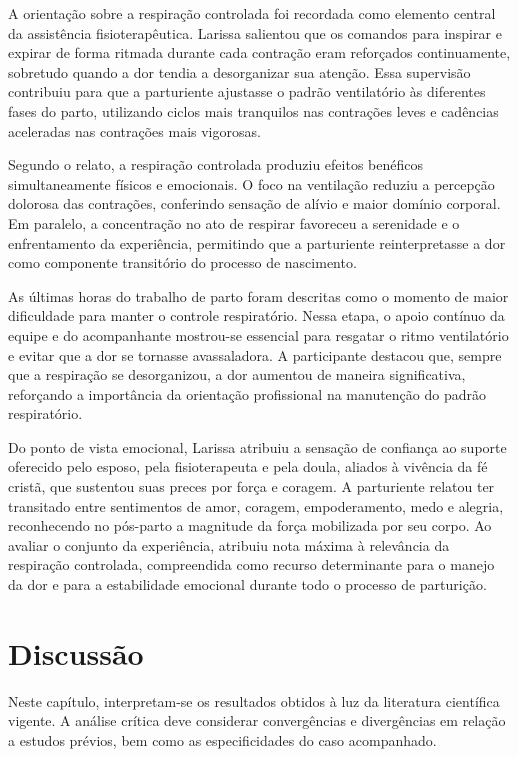 \documentclass[openright]{tex/estilos/normas-utf-tex}
\begin{document}
A orientação sobre a respiração controlada foi recordada como elemento central da assistência fisioterapêutica. Larissa salientou que os comandos para inspirar e expirar de forma ritmada durante cada contração eram reforçados continuamente, sobretudo quando a dor tendia a desorganizar sua atenção. Essa supervisão contribuiu para que a parturiente ajustasse o padrão ventilatório às diferentes fases do parto, utilizando ciclos mais tranquilos nas contrações leves e cadências aceleradas nas contrações mais vigorosas.

Segundo o relato, a respiração controlada produziu efeitos benéficos simultaneamente físicos e emocionais. O foco na ventilação reduziu a percepção dolorosa das contrações, conferindo sensação de alívio e maior domínio corporal. Em paralelo, a concentração no ato de respirar favoreceu a serenidade e o enfrentamento da experiência, permitindo que a parturiente reinterpretasse a dor como componente transitório do processo de nascimento.

As últimas horas do trabalho de parto foram descritas como o momento de maior dificuldade para manter o controle respiratório. Nessa etapa, o apoio contínuo da equipe e do acompanhante mostrou-se essencial para resgatar o ritmo ventilatório e evitar que a dor se tornasse avassaladora. A participante destacou que, sempre que a respiração se desorganizou, a dor aumentou de maneira significativa, reforçando a importância da orientação profissional na manutenção do padrão respiratório.

Do ponto de vista emocional, Larissa atribuiu a sensação de confiança ao suporte oferecido pelo esposo, pela fisioterapeuta e pela doula, aliados à vivência da fé cristã, que sustentou suas preces por força e coragem. A parturiente relatou ter transitado entre sentimentos de amor, coragem, empoderamento, medo e alegria, reconhecendo no pós-parto a magnitude da força mobilizada por seu corpo. Ao avaliar o conjunto da experiência, atribuiu nota máxima à relevância da respiração controlada, compreendida como recurso determinante para o manejo da dor e para a estabilidade emocional durante todo o processo de parturição.

\chapter{Discussão}
\label{chap:discussao}

Neste capítulo, interpretam-se os resultados obtidos à luz da literatura científica vigente. A análise crítica deve considerar convergências e divergências em relação a estudos prévios, bem como as especificidades do caso acompanhado.
\end{document}
